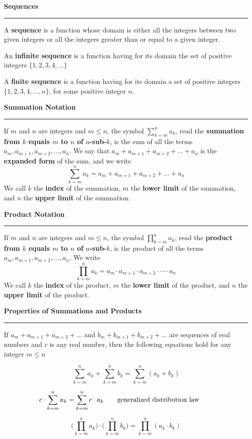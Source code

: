 {\bf Sequences}
\hrule
\vskip 6pt

A {\bf sequence} is a function whose domain is either all the integers between two given integers or all the integers greater than or equal to a given integer.
\vskip 1cm

An {\bf infinite sequence} is a function having for its domain the set of positive integers $\lbrace 1, 2, 3, 4, \ldots\rbrace$

\vskip 1cm
A {\bf finite sequence} is a function having for its domain a set of positive integers $\lbrace 1, 2, 3, 4, \ldots ,n\rbrace$, for some positive integer $n$.

\vskip 1cm
{\bf Summation Notation}

\vskip 1mm
\hrule

\vskip 6pt
If $m$ and $n$ are integers and $m\leq n$, the symbol $\sum^n_{k=m}a_k$, read the {\bf summation from $k$ equals $m$ to $n$ of $a$-sub-$k$}, is the sum of all the terms $a_m,a_{m+1}, a_{m+2},\ldots, a_n$. We say that $a_m+a_{m+1}+a_{m+2}+\ldots +a_n$ is the {\bf expanded form} of the sum, and we write $$\sum^n_{k=m}a_k=a_m+a_{m+1}+a_{m+2}+\ldots +a_n$$ We call $k$ the {\bf index} of the summation, $m$ the {\bf lower limit} of the summation, and $n$ the {\bf upper limit} of the summation.

\vskip 1cm
{\bf Product Notation}

\vskip 1mm
\hrule

\vskip 6pt
If $m$ and $n$ are integers and $m\leq n$, the symbol $\prod^n_{k=m}a_k$, read the {\bf product from $k$ equals $m$ to $n$ of $a$-sub-$k$}, is the product of all the terms $a_m,a_{m+1}, a_{m+2},\ldots, a_n$. We write $$\prod^n_{k=m}a_k=a_m\cdot a_{m+1}\cdot a_{m+2}\cdot \cdots \cdot a_n$$ We call $k$ the {\bf index} of the product, $m$ the {\bf lower limit} of the product, and $n$ the {\bf upper limit} of the product.

\vskip 1cm
{\bf Properties of Summations and Products}

\vskip 1mm
\hrule

\vskip 6pt
If $a_m+a_{m+1}+a_{m+2}+\ldots$ and $b_m+b_{m+1}+b_{m+2}+\ldots$ are sequences of real numbers and $c$ is any real number, then the following equations hold for any integer $m\leq n$

$$\sum^n_{k=m}a_k+\sum^n_{k=m}b_k=\sum^n_{k=m}(a_k+b_k)$$

$$c \cdot \sum^n_{k=m}a_k= \sum^n_{k=m}c\cdot a_k \qquad\hbox{generalized distribution law}\qquad$$

$$\Biggl(\prod^n_{k=m}a_k\Biggr)\cdot \Biggl(\prod^n_{k=m}b_k\Biggr)=\prod^n_{k=m}(a_k\cdot b_k)$$

\vfill\eject
